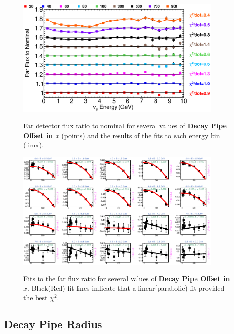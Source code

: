 \begin{figure}[ht]
  \begin{center}
    {\includegraphics[width=4.0in]{figures/DecayPipeOffsetX_far_summary.eps}}
  \end{center}
\caption{ Far detector flux ratio to nominal for several values of {\bf Decay Pipe Offset in $x$} (points) and the results of the fits to each energy bin (lines).}
\end{figure}

\begin{figure}[hb]
  \begin{center}
    {\includegraphics[width=4.0in]{figures/DecayPipeOffsetX_far_fits.eps}}
  \end{center}
\caption{ Fits to the far flux ratio for several values of {\bf Decay Pipe Offset in $x$}. Black(Red) fit lines indicate that a linear(parabolic) fit provided the best $\chi^2$. }
\end{figure}

\clearpage
\subsection{Decay Pipe Radius}

